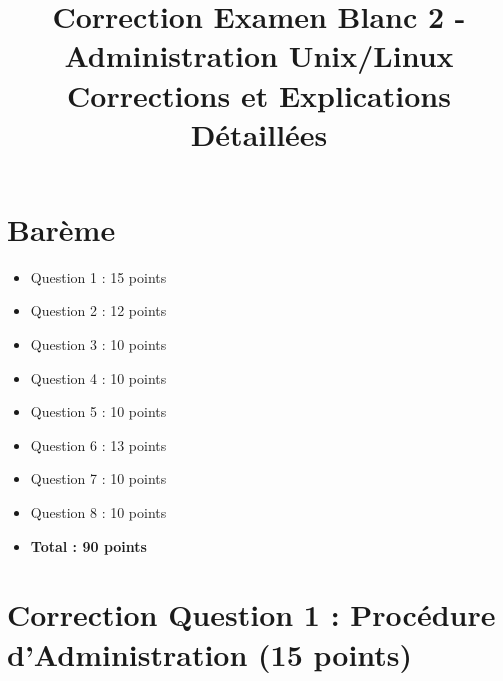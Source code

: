 \documentclass[12pt,a4paper]{article}
\title{\textbf{Correction Examen Blanc 2 - Administration Unix/Linux}\\
\large Corrections et Explications Détaillées}
\author{}
\date{}
\begin{document}
\maketitle
\thispagestyle{fancy}

\section*{Barème}
\begin{itemize}
    \item Question 1 : 15 points
    \item Question 2 : 12 points
    \item Question 3 : 10 points
    \item Question 4 : 10 points
    \item Question 5 : 10 points
    \item Question 6 : 13 points
    \item Question 7 : 10 points
    \item Question 8 : 10 points
    \item \textbf{Total : 90 points}
\end{itemize}

\newpage


\section{Correction Question 1 : Procédure d'Administration (15 points)}
\end{document}
